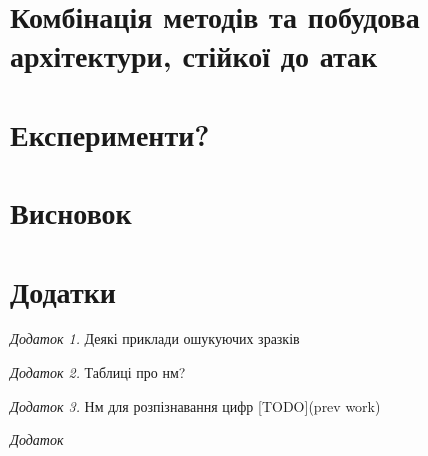 \documentclass[14pt,a4paper]{extarticle}
\newcounter{e}
\numberwithin{equation}{section}
\numberwithin{figure}{section}
\begin{document}
 \newpage
 \thispagestyle{empty}
 \section{Комбінація методів та побудова архітектури, стійкої до атак}
 
 \newpage
 \thispagestyle{empty}
 \section{Експерименти?}
 
 \newpage
 \thispagestyle{empty}
 \section*{Висновок}
 
 \newpage
 \thispagestyle{empty}
 \section*{Додатки}
 
 \textit{Додаток 1.} Деякі приклади ошукуючих зразків
 
 \textit{Додаток 2.} Таблиці про нм?
 
 \textit{Додаток 3.} Нм для розпізнавання цифр [TODO](prev work)
 
 \textit{Додаток}
\end{document}
